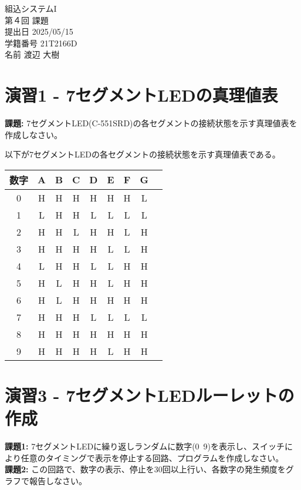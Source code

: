 \documentclass[a4paper,11pt,dvipdfmx]{jsarticle}
\begin{document}
\begin{titlepage}
\noindent
\vspace{4cm}
\begin{center}
\begin{LARGE}
組込システムI \\
第４回  課題 \\
\vspace{8cm}
提出日  2025/05/15 \\
学籍番号  21T2166D \\
名前  渡辺 大樹 \\
\end{LARGE}
\end{center}
\end{titlepage}


\section{演習1 - 7セグメントLEDの真理値表}
\begin{shaded}
    \noindent
    \textbf{課題:} 7セグメントLED(C-551SRD)の各セグメントの接続状態を示す真理値表を作成しなさい。
\end{shaded}

以下が7セグメントLEDの各セグメントの接続状態を示す真理値表である。
\begin{center}
\begin{tabular}{|c|c|c|c|c|c|c|c|c|} 
\hline
\textbf{数字} & \textbf{A} & \textbf{B} & \textbf{C} & \textbf{D} & \textbf{E} & \textbf{F} & \textbf{G} \\
\hline
0 & H & H & H & H & H & H & L \\
1 & L & H & H & L & L & L & L \\
2 & H & H & L & H & H & L & H \\
3 & H & H & H & H & L & L & H \\
4 & L & H & H & L & L & H & H \\
5 & H & L & H & H & L & H & H \\
6 & H & L & H & H & H & H & H \\
7 & H & H & H & L & L & L & L \\
8 & H & H & H & H & H & H & H \\
9 & H & H & H & H & L & H & H \\
\hline
\end{tabular}
\end{center}

\section{演習3 - 7セグメントLEDルーレットの作成}
\begin{shaded}
    \noindent
    \textbf{課題1:} 7セグメントLEDに繰り返しランダムに数字(0~9)を表示し、スイッチにより任意のタイミングで表示を停止する回路、プログラムを作成しなさい。 \\
    \textbf{課題2:} この回路で、数字の表示、停止を30回以上行い、各数字の発生頻度をグラフで報告しなさい。

\end{shaded}
\end{document}
